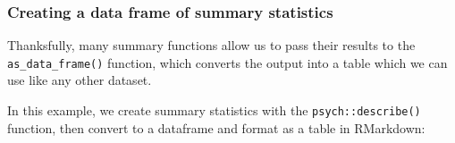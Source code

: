 \documentclass[]{article}
\newenvironment{Shaded}{\begin{snugshade}}{\end{snugshade}}
\newcommand{\KeywordTok}[1]{\textcolor[rgb]{0.13,0.29,0.53}{\textbf{#1}}}
\newcommand{\DataTypeTok}[1]{\textcolor[rgb]{0.13,0.29,0.53}{#1}}
\newcommand{\StringTok}[1]{\textcolor[rgb]{0.31,0.60,0.02}{#1}}
\newcommand{\OtherTok}[1]{\textcolor[rgb]{0.56,0.35,0.01}{#1}}
\newcommand{\OperatorTok}[1]{\textcolor[rgb]{0.81,0.36,0.00}{\textbf{#1}}}
\newcommand{\NormalTok}[1]{#1}
\theoremstyle{definition}
\theoremstyle{definition}
\theoremstyle{definition}
\theoremstyle{remark}
\begin{document}
\subsubsection*{Creating a data frame of summary
statistics}\label{creating-a-data-frame-of-summary-statistics}

Thanksfully, many summary functions allow us to pass their results to
the \texttt{as\_data\_frame()} function, which converts the output into
a table which we can use like any other dataset.

In this example, we create summary statistics with the
\texttt{psych::describe()} function, then convert to a dataframe and
format as a table in RMarkdown:

\begin{Shaded}
\end{Shaded}
\end{document}

